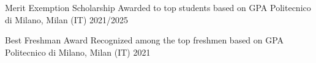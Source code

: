 
\begin{cvhonors}

    \cvhonor
    {Merit Exemption Scholarship}
    {Awarded to top students based on GPA}
    {Politecnico di Milano, Milan (IT)}
    {2021/2025}

    \cvhonor
    {Best Freshman Award}
    {Recognized among the top freshmen based on GPA}
    {Politecnico di Milano, Milan (IT)}
    {2021}

\end{cvhonors}
